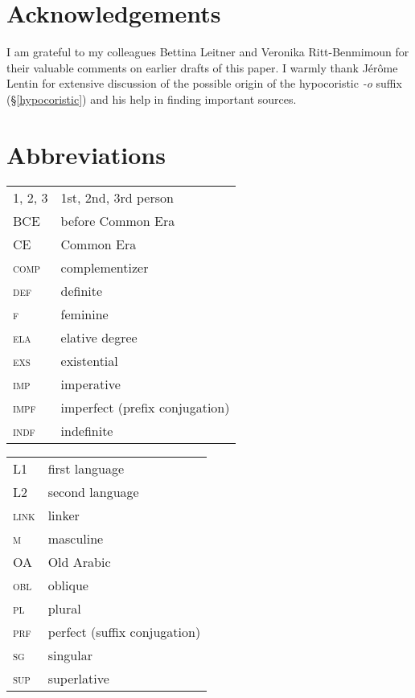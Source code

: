 \documentclass[output=paper]{langsci/langscibook}
\begin{document}
\section*{Acknowledgements}
I am grateful to my colleagues Bettina Leitner and Veronika Ritt-Benmimoun for their valuable comments on earlier drafts of this paper. I warmly thank Jérôme Lentin for extensive discussion of the possible origin of the hypocoristic \textit{-o} suffix (§\ref{hypocoristic}) and his help in finding important sources.

\section*{Abbreviations}

\begin{tabularx}{.5\textwidth}{@{}lQ@{}}
\textsc{1, 2, 3} & 1st, 2nd, 3rd person \\
BCE & before Common Era \\
CE & Common Era \\
\textsc{comp} & complementizer \\
\textsc{def} & definite \\
\textsc{f} & feminine \\
\textsc{ela} & elative degree \\
\textsc{exs} & existential \\
\textsc{imp} & imperative \\
\textsc{impf} & imperfect (prefix conjugation) \\
\textsc{indf} & indefinite \\
\end{tabularx}%
\begin{tabularx}{.5\textwidth}{@{}lQ@{}}
L1 & first language \\
L2 & second language \\
\textsc{link} & linker \\
\textsc{m} & masculine \\
OA & Old Arabic \\
\textsc{obl} & oblique \\
\textsc{pl} & plural \\
\textsc{prf} & perfect (suffix conjugation) \\
\textsc{sg} & singular \\
\textsc{sup} & superlative \\
\end{tabularx}%

\sloppy
\printbibliography[heading=subbibliography,notkeyword=this] 
\end{document}
